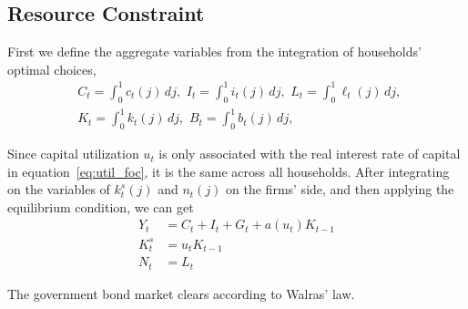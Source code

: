     \subsection{Resource Constraint}
    First we define the aggregate variables from the integration of households' optimal choices,
    \begin{equation}
        \begin{aligned}
            &C_t = \int_{0}^{1} c_t(j) \, dj, \,\, 
            I_t = \int_{0}^{1} i_t(j) \, dj, \,\,
            L_t = \int_{0}^{1} \ell_t(j) \, dj,\,\,\\
            &K_t = \int_{0}^{1} k_t(j) \, dj, \,\,
            B_t = \int_{0}^{1} b_t(j)\, dj,
        \end{aligned}
    \end{equation}

    Since capital utilization $u_t$ is only associated with the real interest rate of capital in equation~\eqref{eq:util_foc}, it is the same across all households. After integrating on the variables of $k^s_t(j)$ and $n_t(j)$ on the firms' side, and then applying the equilibrium condition, we can get
    \begin{equation}
        \begin{aligned}
            Y_t &= C_t + I_t + G_t + a(u_t)K_{t-1} \\
            K_t^s &= u_t K_{t-1} \\
            N_t & = L_t
        \end{aligned}
    \end{equation}

    The government bond market clears according to Walras' law.
